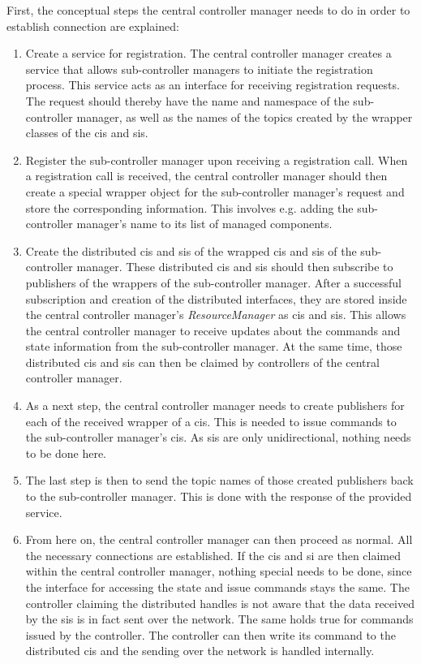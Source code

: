 First, the conceptual steps the central controller manager needs to do in order to establish connection are explained:
\begin{enumerate}
    \item Create a service for registration. The central controller manager creates a service that allows sub-controller managers to initiate the registration process. This service acts as an interface for receiving registration requests. The request should thereby have the name and namespace of the sub-controller manager, as well as the names of the topics created by the wrapper classes of the \glspl{ci} and \glspl{si}. 

    \item Register the sub-controller manager upon receiving a registration call. When a registration call is received, the central controller manager should then create a special wrapper object for the sub-controller manager's request and store the corresponding information. This involves e.g. adding the sub-controller manager's name to its list of managed components.

    \item Create the distributed \glspl{ci} and \glspl{si} of the wrapped \glspl{ci} and \glspl{si} of the sub-controller manager. These distributed \glspl{ci} and \glspl{si} should then subscribe to publishers of the wrappers of the sub-controller manager. After a successful subscription and creation of the distributed interfaces, they are stored inside the central controller manager's \textit{ResourceManager} as \glspl{ci} and \glspl{si}. This allows the central controller manager to receive updates about the commands and state information from the sub-controller manager. At the same time, those distributed \glspl{ci} and \glspl{si} can then be claimed by controllers of the central controller manager.

    \item As a next step, the central controller manager needs to create publishers for each of the received wrapper of a \glspl{ci}. This is needed to issue commands to the sub-controller manager's \glspl{ci}. As \glspl{si} are only unidirectional, nothing needs to be done here. 
    
    \item The last step is then to send the topic names of those created publishers back to the sub-controller manager. This is done with the response of the provided service. 

    \item From here on, the central controller manager can then proceed as normal. All the necessary connections are established. If the \glspl{ci} and \gls{si} are then claimed within the central controller manager, nothing special needs to be done, since the interface for accessing the state and issue commands stays the same. The controller claiming the distributed handles is not aware that the data received by the \glspl{si} is in fact sent over the network. The same holds true for commands issued by the controller. The controller can then write its command to the distributed \glspl{ci} and the sending over the network is handled internally.
\end{enumerate}

